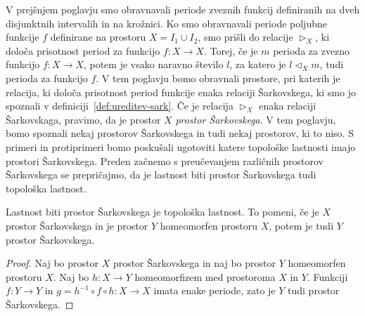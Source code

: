 \documentclass[../TG_magistrsko_delo_sections.tex]{subfiles}
\begin{document}
V prejšnjem poglavju smo obravnavali periode zveznih funkcij definiranih na dveh disjunktnih intervalih in na krožnici. Ko smo obravnavali periode poljubne funkcije $f$ definirane na prostoru $X = I_1 \cup I_2$, smo prišli do relacije $\triangleright_X$, ki določa prisotnost period za funkcijo $f : X \to X$. Torej, če je $m$ perioda za zvezno funkcijo $f:X \to X$, potem je vsako naravno število $l$, za katero je $l \triangleleft_X m$, tudi perioda za funkcijo $f$. V tem poglavju bomo obravnali prostore, pri katerih je relacija, ki določa prisotnost period funkcije enaka relaciji Šarkovskega, ki smo jo spoznali v definiciji~\ref{def:ureditev-sark}. Če je relacija $\triangleright_X$ enaka relaciji Šarkovskaga, pravimo, da je prostor $X$ \emph{prostor Šarkovskega}. V tem poglavju, bomo spoznali nekaj prostorov Šarkovskega in tudi nekaj prostorov, ki to niso. S primeri in protiprimeri bomo poskušali ugotoviti katere topološke lastnosti imajo prostori Šarkovskega.
Preden začnemo s preučevanjem različnih prostorov Šarkovskega se prepričajmo, da je lastnost biti prostor Šarkovskega tudi topološka lastnost. 
\begin{trditev}
Lastnost biti prostor Šarkovskega je topološka lastnost. To pomeni, če je $X$ prostor Šarkovskega in je prostor $Y$ homeomorfen prostoru $X$, potem je tudi $Y$ prostor Šarkovskega.
\end{trditev}
\begin{proof}
Naj bo prostor $X$ prostor Šarkovskega in naj bo prostor $Y$ homeomorfen prostoru $X$. Naj bo $h : X \to Y$ homeomorfizem med prostoroma $X$ in $Y$. Funkciji $f : Y \to Y$ in $g = h^{-1} \circ f \circ h : X \to X$ imata enake periode, zato je $Y$ tudi prostor Šarkovskega.
\end{proof}




\end{document}
